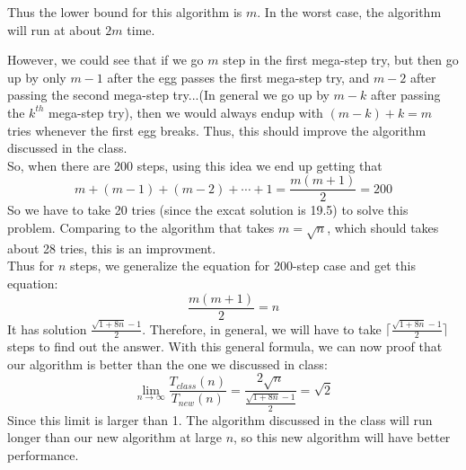 \documentclass[11pt]{amsart}
\theoremstyle{theorem}
\begin{document}
Thus the lower bound for this algorithm is $ m $. In the worst case, the algorithm will run at about $ 2m $ time.

However, we could see that if we go $ m $ step in the first mega-step try, but then go up by only $ m-1 $ after the egg passes the first mega-step try, and $ m-2 $ after passing the second mega-step try...(In general we go up by $ m-k $ after passing the $ k^{th} $ mega-step try), then we would always endup with $ (m-k) + k  = m $ tries whenever the first egg breaks. Thus, this should improve the algorithm discussed in the class.\\

So, when there are 200 steps, using this idea we end up getting that $$ m + (m-1) + (m-2) + \cdots + 1 = \frac{m(m+1)}{2} = 200 $$ So we have to take 20 tries (since the excat solution is 19.5) to solve this problem. Comparing to the algorithm that takes $ m=\sqrt{n} $, which should takes about 28 tries, this is an improvment.\\

Thus for $ n $ steps, we generalize the equation for 200-step case and get this equation: $$ \frac{m(m+1)}{2} = n $$ It has solution $ \frac{\sqrt{1+8n}-1}{2} $. Therefore, in general, we will have to take $ \lceil \frac{\sqrt{1+8n}-1}{2} \rceil $ steps to find out the answer. With this general formula, we can now proof that our algorithm is better than the one we discussed in class:\[
\lim_{n \rightarrow \infty} \frac{T_{class}(n)}{T_{new}(n)} = \frac{2\sqrt{n}}{\frac{\sqrt{1+8n}-1}{2}} = \sqrt{2}
\]
Since this limit is larger than 1. The algorithm discussed in the class will run longer than our new algorithm at large $ n $, so this new algorithm will have better performance.
\end{document}
